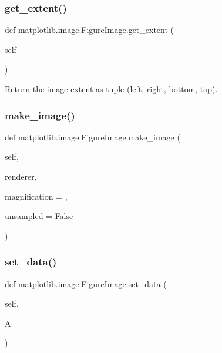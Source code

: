\subsubsection{\texorpdfstring{get\+\_\+extent()}{get\_extent()}}
{\footnotesize\ttfamily def matplotlib.\+image.\+Figure\+Image.\+get\+\_\+extent (\begin{DoxyParamCaption}\item[{}]{self }\end{DoxyParamCaption})}

\begin{DoxyVerb}Return the image extent as tuple (left, right, bottom, top).\end{DoxyVerb}
 \mbox{\label{classmatplotlib_1_1image_1_1FigureImage_aee5b4fdf85424dff9f4e63631f0cac9b}} 
\subsubsection{\texorpdfstring{make\+\_\+image()}{make\_image()}}
{\footnotesize\ttfamily def matplotlib.\+image.\+Figure\+Image.\+make\+\_\+image (\begin{DoxyParamCaption}\item[{}]{self,  }\item[{}]{renderer,  }\item[{}]{magnification = {},  }\item[{}]{unsampled = {\ttfamily False} }\end{DoxyParamCaption})}

\mbox{\label{classmatplotlib_1_1image_1_1FigureImage_a674040dedef3061024f684a06307161b}} 
\subsubsection{\texorpdfstring{set\+\_\+data()}{set\_data()}}
{\footnotesize\ttfamily def matplotlib.\+image.\+Figure\+Image.\+set\+\_\+data (\begin{DoxyParamCaption}\item[{}]{self,  }\item[{}]{A }\end{DoxyParamCaption})}

